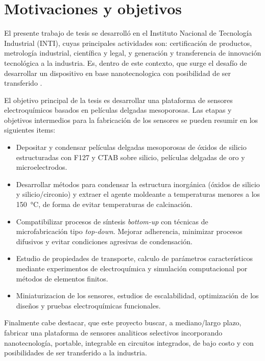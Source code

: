 

\section{Motivaciones y objetivos}

	El presente trabajo de tesis se desarrolló en el Instituto Nacional de Tecnología Industrial (INTI), cuyas principales actividades son: certificación de productos, metrología industrial, científica y legal, y generación y transferencia	de innovación tecnológica a la industria. Es, dentro de este contexto, que surge el desafío de desarrollar un dispositivo en base nanotecnologica con posibilidad de ser transferido . 

	El objetivo principal de la tesis es desarrollar una plataforma de sensores electroquímicos basados en películas delgadas mesoporosas. Las etapas y objetivos intermedios para la fabricación de los sensores se pueden resumir en los siguientes items:

	\begin{itemize}
		
		\item Depositar y condensar películas delgadas mesoporosas de óxidos de silicio estructuradas con F127 y CTAB sobre silicio, películas delgadas de oro y microelectrodos.  
		
		\item Desarrollar métodos para condensar la estructura inorgánica (óxidos de silicio y silicio/circonio) y extraer el agente moldeante a temperaturas menores a los \SI{150}{\celsius}, de forma de evitar temperaturas de calcinación. 

		\item Compatibilizar procesos de síntesis \textit{bottom-up} con técnicas de microfabricación tipo \textit{top-down}. Mejorar adherencia, minimizar procesos difusivos y evitar condiciones agresivas de condensación.

		\item Estudio de propiedades de transporte, calculo de parámetros característicos mediante experimentos de electroquímica y simulación computacional por métodos de elementos finitos.

		\item Miniaturizacion de los sensores, estudios de escalabilidad, optimización de los diseños y pruebas electroquímicas funcionales.

		\end{itemize}	

	Finalmente cabe destacar, que este proyecto buscar, a mediano/largo plazo, fabricar una plataforma de sensores analiticos selectivos incorporando nanotecnología, portable, integrable en circuitos integrados, de bajo costo y con posibilidades de ser transferido a la industria.